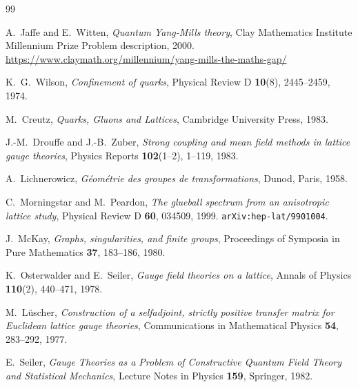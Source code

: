 \documentclass[12pt,a4paper]{article}
\theoremstyle{definition}
\theoremstyle{remark}
\begin{document}
\begin{thebibliography}{99}

A.~Jaffe and E.~Witten,
\emph{Quantum Yang-Mills theory},
Clay Mathematics Institute Millennium Prize Problem description, 2000.
\url{https://www.claymath.org/millennium/yang-mills-the-maths-gap/}

K.~G.~Wilson,
\emph{Confinement of quarks},
Physical Review D \textbf{10}(8), 2445--2459, 1974.

M.~Creutz,
\emph{Quarks, Gluons and Lattices},
Cambridge University Press, 1983.

J.-M.~Drouffe and J.-B.~Zuber,
\emph{Strong coupling and mean field methods in lattice gauge theories},
Physics Reports \textbf{102}(1--2), 1--119, 1983.

A.~Lichnerowicz,
\emph{G\'{e}om\'{e}trie des groupes de transformations},
Dunod, Paris, 1958.

C.~Morningstar and M.~Peardon,
\emph{The glueball spectrum from an anisotropic lattice study},
Physical Review D \textbf{60}, 034509, 1999.
\texttt{arXiv:hep-lat/9901004}.

J.~McKay,
\emph{Graphs, singularities, and finite groups},
Proceedings of Symposia in Pure Mathematics \textbf{37}, 183--186, 1980.

K.~Osterwalder and E.~Seiler,
\emph{Gauge field theories on a lattice},
Annals of Physics \textbf{110}(2), 440--471, 1978.

M.~L\"{u}scher,
\emph{Construction of a selfadjoint, strictly positive transfer matrix
for Euclidean lattice gauge theories},
Communications in Mathematical Physics \textbf{54}, 283--292, 1977.

E.~Seiler,
\emph{Gauge Theories as a Problem of Constructive Quantum Field Theory
and Statistical Mechanics},
Lecture Notes in Physics \textbf{159}, Springer, 1982.

\end{thebibliography}
\end{document}
